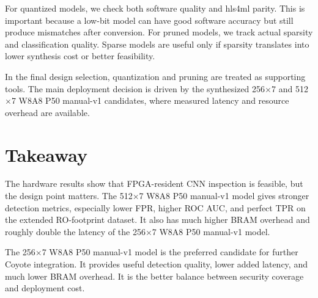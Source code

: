 For quantized models, we check both software quality and hls4ml parity. This is important because a low-bit model can have good software accuracy but still produce mismatches after conversion. For pruned models, we track actual sparsity and classification quality. Sparse models are useful only if sparsity translates into lower synthesis cost or better feasibility.

In the final design selection, quantization and pruning are treated as supporting tools. The main deployment decision is driven by the synthesized 256$\times$7 and 512$\times$7 W8A8 P50 manual-v1 candidates, where measured latency and resource overhead are available.

\section{Takeaway}
\label{sec:hls4ml-takeaway}

The hardware results show that FPGA-resident CNN inspection is feasible, but the design point matters. The 512$\times$7 W8A8 P50 manual-v1 model gives stronger detection metrics, especially lower FPR, higher ROC AUC, and perfect TPR on the extended RO-footprint dataset. It also has much higher BRAM overhead and roughly double the latency of the 256$\times$7 W8A8 P50 manual-v1 model.

The 256$\times$7 W8A8 P50 manual-v1 model is the preferred candidate for further Coyote integration. It provides useful detection quality, lower added latency, and much lower BRAM overhead. It is the better balance between security coverage and deployment cost.
